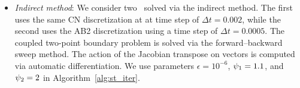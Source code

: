\begin{itemize}
\begin{itemize}
\item \textit{Indirect method}: We consider two \methodAcronymROMs\ solved via the indirect method. The first uses the same CN discretization at at time step of $\Delta t = 0.002$, while the second uses the AB2 discretization using a time step of $\Delta t = 0.0005$. The coupled two-point boundary 
problem is solved via the forward--backward sweep method. The action of the Jacobian transpose on vectors is computed via automatic differentiation. We use parameters $\epsilon = 10^{-6}$, $\psi_1 = 1.1$, and $\psi_2=2$ in Algorithm~\ref{alg:st_iter}. 
\end{itemize}
\end{itemize}

%



